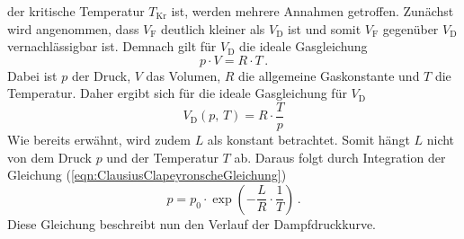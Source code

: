 der kritische Temperatur $T_{\text{Kr}}$ ist, werden mehrere Annahmen getroffen. Zunächst wird angenommen, dass $V_{\text{F}}$ deutlich kleiner als $V_{\text{D}}$ ist und somit
$V_{\text{F}}$ gegenüber $V_{\text{D}}$ vernachlässigbar ist. Demnach gilt für $V_{\text{D}}$ die ideale Gasgleichung 
\begin{equation}
    p \cdot V = R \cdot T\,.
    \label{eqn:idealeGasgleichung}
\end{equation}
Dabei ist $p$ der Druck, $V$ das Volumen, $R$ die allgemeine Gaskonstante und $T$ die Temperatur. Daher ergibt sich für die ideale Gasgleichung für $V_{\text{D}}$ 
\begin{equation}
    V_{\text{D}} \left(p,\, T\right) = R\cdot \frac{T}{p}
    \label{eqn:idealeGasgleichung_V_D}
\end{equation}
Wie bereits erwähnt, wird zudem $L$ als konstant betrachtet. Somit hängt $L$ nicht von dem Druck $p$ und der Temperatur $T$ ab. Daraus folgt durch
Integration der Gleichung (\ref{eqn:ClausiusClapeyronscheGleichung})
\begin{equation}
    p = p_{0} \cdot \exp{\left(-\frac{L}{R}\cdot \frac{1}{T}\right)}\,.
    \label{eqn:Druck_p}
\end{equation}
Diese Gleichung beschreibt nun den Verlauf der Dampfdruckkurve.
